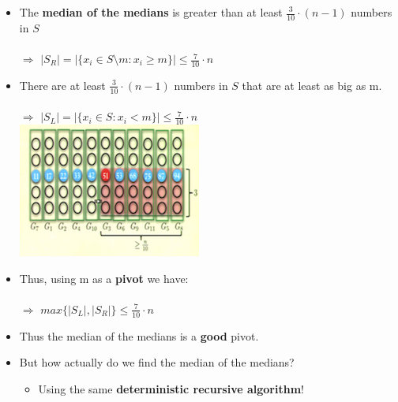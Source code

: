 \documentclass[12pt]{article}
\begin{document}
\begin{itemize}
\item The \textbf{median of the medians} is greater than at least {\large $\frac{3}{10} \cdot (n - 1)$ }numbers in $S$\\
\\
$\Rightarrow$     {\large $|S_R| = |\{x_i \in S \setminus m : x_i \geq m\}| \leq \frac{7}{10} \cdot n$}
\item There are at least {\large $\frac{3}{10} \cdot (n - 1)$ } numbers in $S$ that are at least as big as m.\\
\\
$\Rightarrow$     {\large $|S_L| = |\{x_i \in S : x_i < m\}| \leq \frac{7}{10} \cdot n$}\\
\includegraphics{lecture58}
\item Thus, using m as a \textbf{pivot} we have:\\
\\
$\Rightarrow$    {\large $max\{|S_L|, |S_R|\} \leq \frac{7}{10} \cdot n$}
\item Thus the median of the medians is a \textbf{good} pivot.
\item But how actually do we find the median of the medians?
	\begin{itemize}
	\item Using the same \textbf{deterministic recursive algorithm}!
	\end{itemize}
\end{itemize}
\end{document}
